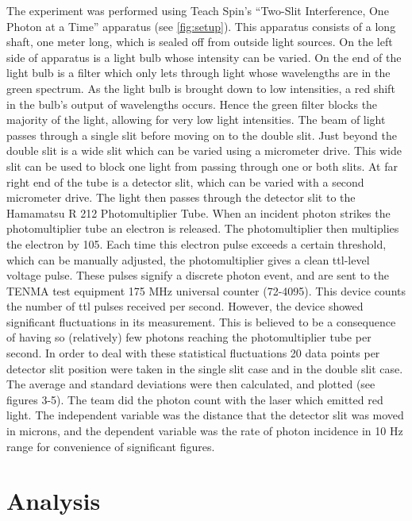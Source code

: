\documentclass[12pt,twocolumn]{article}
\begin{document}
The experiment was performed using Teach Spin’s “Two-Slit Interference, One Photon at a Time” apparatus (see \ref{fig:setup}). This apparatus consists of a long shaft, one meter long, which is sealed off from outside light sources. On the left side of apparatus is a light bulb whose intensity can be varied. On the end of the light bulb is a filter which only lets through light whose wavelengths are in the green spectrum.   As the light bulb is brought down to low intensities, a red shift in the bulb’s output of wavelengths occurs. Hence the green filter blocks the majority of the light, allowing for very low light intensities. The beam of light passes through a single slit before moving on to the double slit. Just beyond the double slit is a wide slit which can be varied using a micrometer drive. This wide slit can be used to block one light from passing through one or both slits. At far right end of the tube is a detector slit, which can be varied with a second micrometer drive. The light then passes through the detector slit to the Hamamatsu R 212 Photomultiplier Tube. When an incident photon strikes the photomultiplier tube an electron is released. The photomultiplier then multiplies the electron by 105. Each time this electron pulse exceeds a certain threshold, which can be manually adjusted, the photomultiplier gives a clean ttl-level voltage pulse. These pulses signify a discrete photon event, and are sent to the TENMA test equipment 175 MHz universal counter (72-4095). This device counts the number of ttl pulses received per second. However, the device showed significant fluctuations in its measurement. This is believed to be a consequence of having so (relatively) few photons reaching the photomultiplier tube per second. In order to deal with these statistical fluctuations 20 data points per detector slit position were taken in the single slit case and in the double slit case. The average and standard deviations were then calculated, and plotted (see figures 3-5). The team did the photon count with the laser which emitted red light.  The independent variable was the distance that the detector slit was moved in microns, and the dependent variable was the rate of photon incidence in 10 Hz range for convenience of significant figures.


\section{Analysis}
\end{document}
